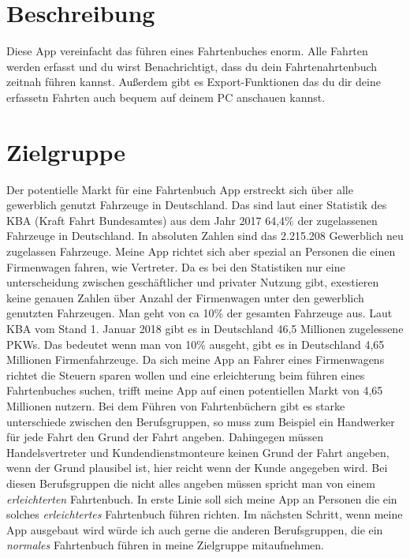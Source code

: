 \documentclass[a4paper]{article}
\begin{document}
\section{Beschreibung}
Diese App vereinfacht das führen eines Fahrtenbuches enorm. 
Alle Fahrten werden erfasst und du wirst Benachrichtigt, dass du dein 
Fahrtenahrtenbuch zeitnah führen kannst. 
Außerdem gibt es Export-Funktionen das du dir deine erfassetn Fahrten 
auch bequem auf deinem PC anschauen kannst.

\section{Zielgruppe}
Der potentielle Markt für eine Fahrtenbuch App erstreckt sich über alle
gewerblich genutzt Fahrzeuge in Deutschland. Das sind laut einer Statistik des KBA (Kraft Fahrt Bundesamtes)
aus dem Jahr 2017 64,4\% der zugelassenen Fahrzeuge in Deutschland. In absoluten Zahlen sind das 2.215.208
Gewerblich neu zugelassen Fahrzeuge. Meine App richtet sich aber spezial an Personen die einen
Firmenwagen fahren, wie Vertreter. Da es bei den Statistiken nur eine unterscheidung zwischen
geschäftlicher und privater Nutzung gibt, exestieren keine genauen Zahlen über Anzahl der Firmenwagen
unter den gewerblich genutzten Fahrzeugen. Man geht von ca 10\% der gesamten Fahrzeuge aus.
Laut KBA vom Stand 1. Januar 2018 gibt es in Deutschland 46,5 Millionen zugelessene PKWs.
Das bedeutet wenn man von 10\% ausgeht, gibt es in Deutschland 4,65 Millionen Firmenfahrzeuge.
Da sich meine App an Fahrer eines Firmenwagens richtet die Steuern sparen wollen und eine
erleichterung beim führen eines Fahrtenbuches suchen, trifft meine App auf einen potentiellen
Markt von 4,65 Millionen nutzern. Bei dem Führen von Fahrtenbüchern gibt es starke unterschiede
zwischen den Berufsgruppen, so muss zum Beispiel ein Handwerker für jede Fahrt den Grund der Fahrt angeben.
Dahingegen müssen Handelsvertreter und Kundendienstmonteure keinen Grund der Fahrt angeben, wenn der Grund
plausibel ist, hier reicht wenn der Kunde angegeben wird. Bei diesen Berufsgruppen die nicht alles angeben
müssen spricht man von einem \textit{erleichterten} Fahrtenbuch. In erste Linie soll sich meine App an Personen
die ein solches \textit{erleichtertes} Fahrtenbuch führen richten. Im nächsten Schritt, wenn meine App ausgebaut wird
würde ich auch gerne die anderen Berufsgruppen, die ein \textit{normales} Fahrtenbuch führen in
meine Zielgruppe mitaufnehmen.

\end{document}
